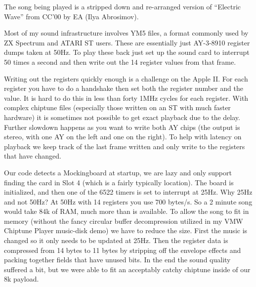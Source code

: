 \documentclass[twocolumn]{article}
\begin{document}
The song being played is a stripped down and re-arranged version of
``Electric Wave'' from CC'00 by EA (Ilya Abrosimov). 

Most of my sound infrastructure involves YM5 files, a format commonly
used  by ZX Spectrum and ATARI ST users.
These are essentially just AY-3-8910 register dumps taken at 50Hz.  
To play these back just set up the sound card to interrupt 50 times a second
and then write out the 14 register values from that frame.


Writing out the registers quickly enough is a challenge on the Apple II.
For each register you have to do a handshake then set both the register 
number and the value.
It is hard to do this in less than forty 1MHz cycles for each register.
With complex chiptune files (especially those written on an ST with much
faster hardware) it is sometimes not possible to get exact playback
due to the delay.
Further slowdown happens as you want to write both AY chips (the output
is stereo, with one AY on the left and one on the right).
To help with latency on playback we keep track of the last frame written
and only write to the registers that have changed.


Our code detects a Mockingboard at startup, we are lazy and only support
finding the card in Slot 4 (which is a fairly typically location).
The board is initialized, and then one of the 6522 timers is set to
interrupt at 25Hz.
Why 25Hz and not 50Hz?  At 50Hz with 14 registers you use 700 bytes/s.
So a 2 minute song would take 84k of RAM, much more than is available.
To allow the song to fit in memory (without the fancy circular buffer
decompression utilized in my VMW Chiptune Player music-disk demo) we have
to reduce the size.
First the music is changed so it only needs to be updated at 25Hz.
Then the register data is compressed from 14 bytes to 11 bytes by stripping off
the envelope effects and packing together fields that have unused bits.
In the end the sound quality suffered a bit, but we were able to fit an
acceptably catchy chiptune inside of our 8k payload.
\end{document}
